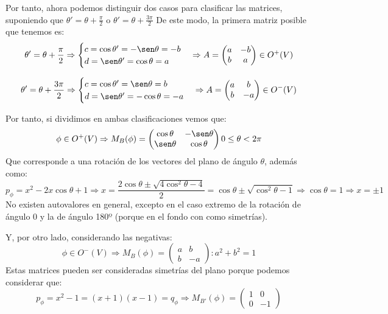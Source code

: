 \documentclass[10pt,a4paper,openright]{book}
\theoremstyle{break}
\begin{document}
Por tanto, ahora podemos distinguir dos casos para clasificar las matrices, suponiendo que $\theta ' = \theta +\frac{\pi}{2}$ o $\theta ' = \theta + \frac{3\pi}{2}$
De este modo, la primera matriz posible que tenemos es:
$$\theta' = \theta +\frac{\pi}{2} \Rightarrow \begin{cases} c = \cos \theta' = -\sen \theta = -b \\ d = \sen \theta' = \cos\theta = a \end{cases} \Rightarrow A = \begin{pmatrix} a & -b \\ b & a\end{pmatrix} \in O^+(V)$$

$$\theta' = \theta +\frac{3\pi}{2} \Rightarrow \begin{cases} c = \cos \theta' = \sen \theta = b \\ d = \sen \theta' = -\cos\theta = -a \end{cases} \Rightarrow A = \begin{pmatrix} a & b \\ b & -a\end{pmatrix}\in O^-(V)$$

Por tanto, si dividimos en ambas clasificaciones vemos que:
$$\phi\in O^+(V)\Rightarrow M_B(\phi)  = \begin{pmatrix} \cos \theta & -\sen \theta  \\ \sen \theta & \cos \theta \end{pmatrix} 0 \leq \theta < 2\pi$$
Que corresponde a una rotación de los vectores del plano de ángulo $\theta$, además como:
$$p_\phi = x^2-2x\cos \theta + 1\Rightarrow x = \frac{2\cos\theta \pm \sqrt{4\cos^2\theta - 4}}{2} = \cos\theta \pm \sqrt{\cos^2\theta - 1}\Rightarrow \cos\theta = 1\Rightarrow x = \pm 1$$
No existen autovalores en general, excepto en el caso extremo de la rotación de ángulo 0 y la de ángulo 180º (porque en el fondo con como simetrías).

Y, por otro lado, considerando las negativas:
$$ \phi  \in O^-(V)\Rightarrow M_B(\phi) = \begin{pmatrix} a & b  \\ b & -a  \end{pmatrix}: a^2 + b^2 = 1$$
Estas matrices pueden ser consideradas simetrías del plano porque podemos considerar que:
$$p_\phi = x^2 - 1 = (x+1)(x-1) = q_\phi\Rightarrow M_{B'}(\phi) = \begin{pmatrix} 1 & 0  \\ 0 & -1  \end{pmatrix}$$
\end{document}
